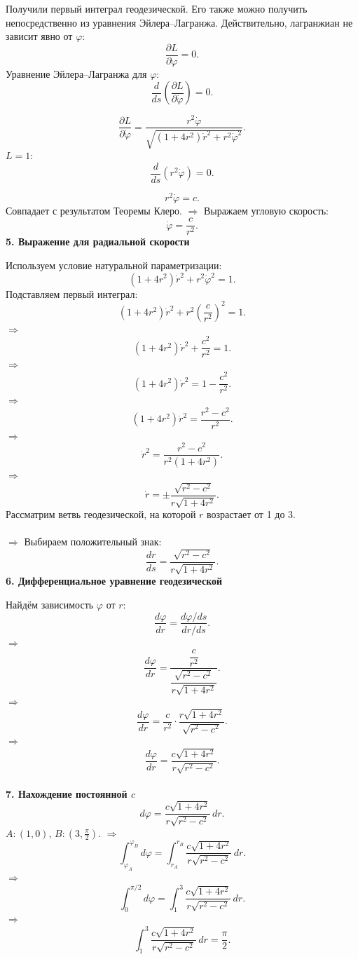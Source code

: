 \documentclass[12pt,a4paper]{article}
\begin{document}
Получили первый интеграл геодезической. Его также можно получить непосредственно из уравнения Эйлера--Лагранжа. Действительно, лагранжиан не зависит явно от \(\varphi\):
\[
\frac{\partial L}{\partial\varphi}=0.
\]
Уравнение Эйлера--Лагранжа для \(\varphi\):
\[
\frac{d}{ds}\left(\frac{\partial L}{\partial\dot\varphi}\right)=0.
\]

\[
\frac{\partial L}{\partial\dot\varphi}=\frac{r^2\dot\varphi}{\sqrt{(1+4r^2)\dot r^2+r^2\dot\varphi^2}}.
\]
\(L=1\):
\[
\frac{d}{ds}(r^2\dot\varphi)=0.
\]

\[
r^2\dot\varphi=c.
\]
Совпадает с результатом Теоремы Клеро.
\(\Rightarrow\) Выражаем угловую скорость:
\[
\boxed{\dot\varphi=\frac{c}{r^2}.}
\]
\newpage
\textbf{5. Выражение для радиальной скорости}

Используем условие натуральной параметризации:
\[
(1+4r^2)\dot r^2+r^2\dot\varphi^2=1.
\]
Подставляем первый интеграл:
\[
(1+4r^2)\dot r^2+r^2\left(\frac{c}{r^2}\right)^2=1.
\]
\(\Rightarrow\)
\[
(1+4r^2)\dot r^2+\frac{c^2}{r^2}=1.
\]
\(\Rightarrow\)
\[
(1+4r^2)\dot r^2=1-\frac{c^2}{r^2}.
\]
\(\Rightarrow\)
\[
(1+4r^2)\dot r^2=\frac{r^2-c^2}{r^2}.
\]
\(\Rightarrow\)
\[
\dot r^2=\frac{r^2-c^2}{r^2(1+4r^2)}.
\]
\(\Rightarrow\)
\[
\dot r=\pm\frac{\sqrt{r^2-c^2}}{r\sqrt{1+4r^2}}.
\]
Рассматрим ветвь геодезической, на которой \(r\) возрастает от 1 до 3.\\

\\ \(\Rightarrow\) Выбираем положительный знак:
\[
\boxed{\frac{dr}{ds}=\frac{\sqrt{r^2-c^2}}{r\sqrt{1+4r^2}}.}
\]
\newpage
\textbf{6. Дифференциальное уравнение геодезической}

Найдём зависимость \(\varphi\) от \(r\):
\[
\frac{d\varphi}{dr}=\frac{d\varphi/ds}{dr/ds}.
\]
\(\Rightarrow\)
\[
\frac{d\varphi}{dr}=\frac{\dfrac{c}{r^2}}{\dfrac{\sqrt{r^2-c^2}}{r\sqrt{1+4r^2}}}.
\]
\(\Rightarrow\)
\[
\frac{d\varphi}{dr}=\frac{c}{r^2}\cdot\frac{r\sqrt{1+4r^2}}{\sqrt{r^2-c^2}}.
\]
\(\Rightarrow\)
\[
\boxed{\frac{d\varphi}{dr}=\frac{c\sqrt{1+4r^2}}{r\sqrt{r^2-c^2}}.}
\]
\\
\textbf{7. Нахождение постоянной \(c\)}
\[
d\varphi=\frac{c\sqrt{1+4r^2}}{r\sqrt{r^2-c^2}}\,dr.
\]
\(A:(1,0)\), \(B:\left(3,\frac{\pi}{2}\right)\).
\(\Rightarrow\)
\[
\int_{\varphi_A}^{\varphi_B}d\varphi=\int_{r_A}^{r_B}\frac{c\sqrt{1+4r^2}}{r\sqrt{r^2-c^2}}\,dr.
\]
\(\Rightarrow\)
\[
\int_0^{\pi/2}d\varphi=\int_1^3\frac{c\sqrt{1+4r^2}}{r\sqrt{r^2-c^2}}\,dr.
\]
\(\Rightarrow\)
\[
\boxed{\int_1^3\frac{c\sqrt{1+4r^2}}{r\sqrt{r^2-c^2}}\,dr=\frac{\pi}{2}.}
\]
\end{document}
